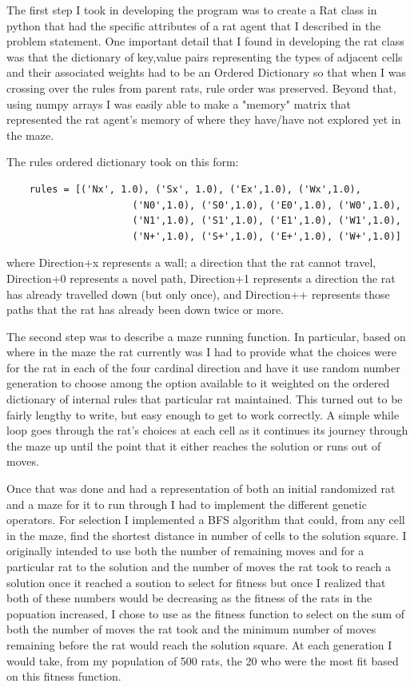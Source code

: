\documentclass[12pt]{article}
\begin{document}
The first step I took in developing the program was to create a Rat class in python that had the specific attributes of a rat agent that I described in the problem statement. One important detail that I found in developing the rat class was that the dictionary of key,value pairs representing the types of adjacent cells and their associated weights had to be an Ordered Dictionary so that when I was crossing over the rules from parent rats, rule order was preserved. Beyond that, using numpy arrays I was easily able to make a "memory" matrix that represented the rat agent's memory of where they have/have not explored yet in the maze.

The rules ordered dictionary took on this form:

\begin{verbatim}
    rules = [('Nx', 1.0), ('Sx', 1.0), ('Ex',1.0), ('Wx',1.0),
                      ('N0',1.0), ('S0',1.0), ('E0',1.0), ('W0',1.0),
                      ('N1',1.0), ('S1',1.0), ('E1',1.0), ('W1',1.0),
                      ('N+',1.0), ('S+',1.0), ('E+',1.0), ('W+',1.0)]
\end{verbatim}

where Direction+x represents a wall; a direction that the rat cannot travel, Direction+0 represents a novel path, Direction+1 represents a direction the rat has already travelled down (but only once), and Direction++ represents those paths that the rat has already been down twice or more.

The second step was to describe a maze running function. In particular, based on where in the maze the rat currently was I had to provide what the choices were for the rat in each of the four cardinal direction and have it use random number generation to choose among the option available to it weighted on the ordered dictionary of internal rules that particular rat maintained. This turned out to be fairly lengthy to write, but easy enough to get to work correctly. A simple while loop goes through the rat's choices at each cell as it continues its journey through the maze up until the point that it either reaches the solution or runs out of moves.

Once that was done and had a representation of both an initial randomized rat and a maze for it to run through I had to implement the different genetic operators. For selection I implemented a BFS algorithm that could, from any cell in the maze, find the shortest distance in number of cells to the solution square. I originally intended to use both the number of remaining moves and for a particular rat to the solution and the number of moves the rat took to reach a solution once it reached a soution to select for fitness but once I realized that both of these numbers would be decreasing as the fitness of the rats in the popuation increased, I chose to use as the fitness function to select on the sum of both the number of moves the rat took and the minimum number of moves remaining before the rat would reach the solution square. At each generation I would take, from my population of 500 rats, the 20 who were the most fit based on this fitness function.
\end{document}
